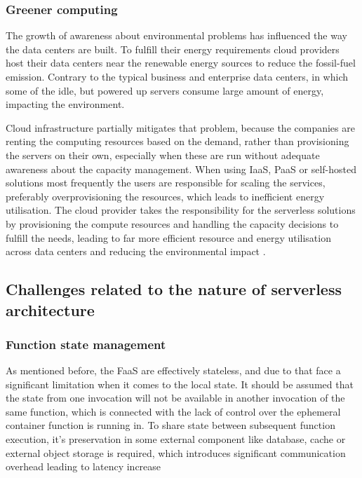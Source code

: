 \subsubsection*{Greener computing}

The growth of awareness about environmental problems has influenced the way the data centers are built. To fulfill their energy requirements cloud providers host their data centers near the renewable energy sources to reduce the fossil-fuel emission. Contrary to the typical business and enterprise data centers, in which some of the idle, but powered up servers consume large amount of energy, impacting the environment.

Cloud infrastructure partially mitigates that problem, because the companies are renting the computing resources based on the demand, rather than provisioning the servers on their own, especially when these are run without adequate awareness about the capacity management. When using IaaS, PaaS or self-hosted solutions most frequently the users are responsible for scaling the services, preferably overprovisioning the resources, which leads to inefficient energy utilisation. The cloud provider takes the responsibility for the serverless solutions by provisioning the compute resources and handling the capacity decisions to fulfill the needs, leading to far more efficient resource and energy utilisation across data centers and reducing the environmental impact \cite{MartinFowlerServerless}.

\subsection{Challenges related to the nature of serverless architecture}

\subsubsection*{Function state management}

As mentioned before, the FaaS are effectively stateless, and due to that face a significant limitation when it comes to the local state. It should be assumed that the state from one invocation will not be available in another invocation of the same function, which is connected with the lack of control over the ephemeral container function is running in. To share state between subsequent function execution, it's preservation in some external component like database, cache or external object storage is required, which introduces significant communication overhead leading to latency increase \cite{MartinFowlerServerless}

